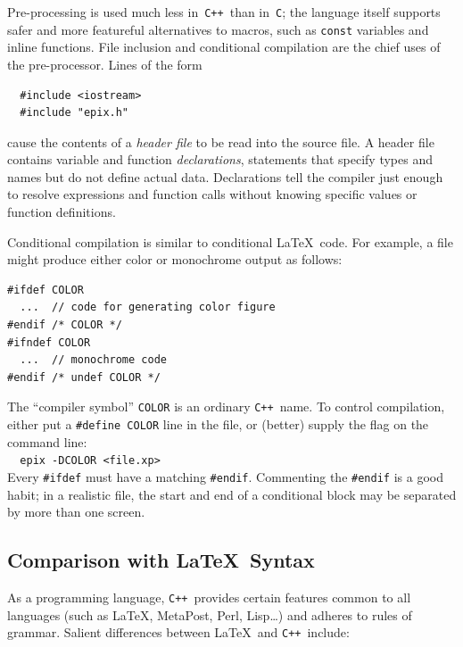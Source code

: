 \documentclass[12pt,letterpaper]{book}
\newcommand{\code}[1]{\texttt{#1}}
\newcommand{\CXX}{\code{C++}}
\begin{document}
Pre-processing is used much less in~\CXX\ than in~\code{C}; the
language itself supports safer and more featureful alternatives to
macros, such as \code{const} variables and inline functions. File
inclusion and conditional compilation are the chief uses of the
pre-processor. Lines of the form 
\begin{verbatim}
  #include <iostream>
  #include "epix.h"
\end{verbatim}
cause the contents of a \emph{header file} to be read into the source
file. A header file contains variable and function
\emph{declarations}, statements that specify types and names but do
not define actual data. Declarations tell the compiler just enough
to resolve expressions and function calls without knowing specific
values or function definitions. 

Conditional compilation is similar to conditional \LaTeX\ code. For
example, a file might produce either color or monochrome output as
follows:
\begin{verbatim}
#ifdef COLOR
  ...  // code for generating color figure
#endif /* COLOR */
#ifndef COLOR
  ...  // monochrome code
#endif /* undef COLOR */
\end{verbatim}
The ``compiler symbol'' \code{COLOR} is an ordinary \CXX\ name. To
control compilation, either put a \code{\#define COLOR} line in the
file, or (better) supply the flag on the command line: \\
\verb+  epix -DCOLOR <file.xp>+ \\
Every \code{\#ifdef} must have a matching \code{\#endif}. Commenting
the \code{\#endif} is a good habit; in a realistic file, the start and
end of a conditional block may be separated by more than one screen.


\subsection{Comparison with \LaTeX\ Syntax}

As a programming language, \CXX\ provides certain features common to
all languages (such as \LaTeX, MetaPost, Perl, Lisp\ldots) and adheres
to rules of grammar. Salient differences between \LaTeX\ and \CXX\ 
include:
\end{document}
